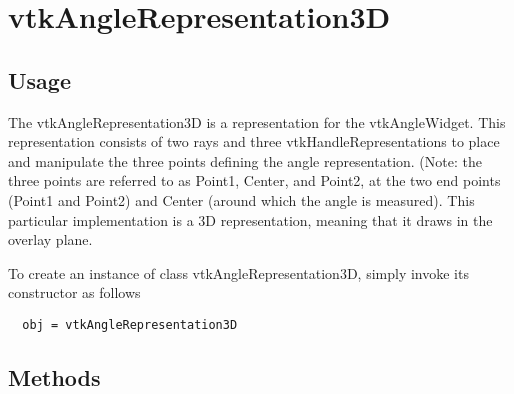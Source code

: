 \section{vtkAngleRepresentation3D}

\subsection{Usage}

 The vtkAngleRepresentation3D is a representation for the
 vtkAngleWidget. This representation consists of two rays and three
 vtkHandleRepresentations to place and manipulate the three points defining
 the angle representation. (Note: the three points are referred to as Point1,
 Center, and Point2, at the two end points (Point1 and Point2) and Center
 (around which the angle is measured). This particular implementation is a 
 3D representation, meaning that it draws in the overlay plane.

To create an instance of class vtkAngleRepresentation3D, simply
invoke its constructor as follows
\begin{verbatim}
  obj = vtkAngleRepresentation3D
\end{verbatim}
\subsection{Methods}

